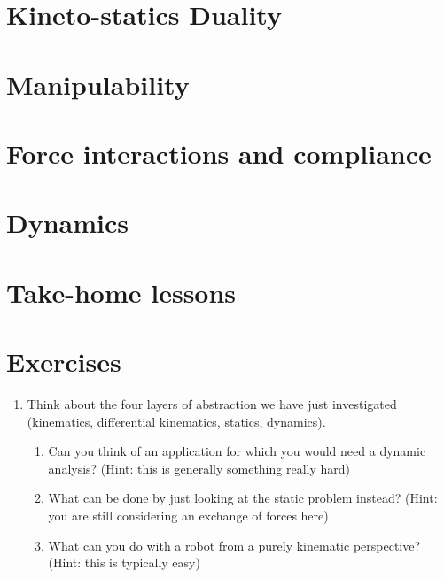 



\section{Kineto-statics Duality}

\section{Manipulability}

\section{Force interactions and compliance}

\section{Dynamics}\label{ch:forces:dynamics}


\section*{Take-home lessons}

\section*{Exercises}\small

\begin{enumerate}
\item Think about the four layers of abstraction we have just investigated (kinematics, differential kinematics, statics, dynamics).
\begin{enumerate}
\item Can you think of an application for which you would need a dynamic analysis? (Hint: this is generally something really hard)
\item What can be done by just looking at the static problem instead? (Hint: you are still considering an exchange of forces here)
\item What can you do with a robot from a purely kinematic perspective? (Hint: this is typically easy)
\end{enumerate}
\end{enumerate}
